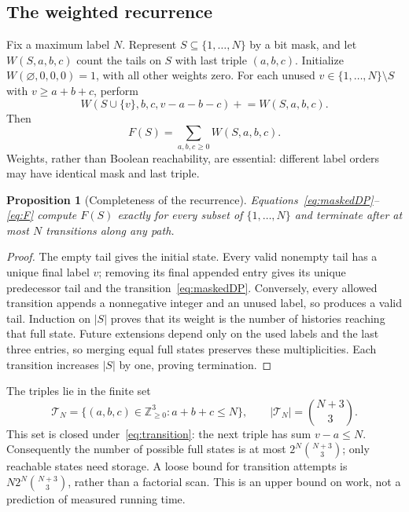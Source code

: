 \documentclass[11pt]{article}
\newtheorem{proposition}[theorem]{Proposition}
\theoremstyle{definition}
\theoremstyle{remark}
\newcommand{\Znn}{\mathbb Z_{\geq0}}
\begin{document}
\subsection{The weighted recurrence}

Fix a maximum label $N$. Represent $S\subseteq\{1,\ldots,N\}$ by a bit
mask, and let $W(S,a,b,c)$ count the tails on $S$ with last triple $(a,b,c)$.
Initialize $W(\varnothing,0,0,0)=1$, with all other weights zero. For each
unused $v\in\{1,\ldots,N\}\setminus S$ with $v\geq a+b+c$, perform
\begin{equation}
 W(S\cup\{v\},b,c,v-a-b-c)\mathrel{+}=W(S,a,b,c).
 \label{eq:maskedDP}
\end{equation}
Then
\begin{equation}
 F(S)=\sum_{a,b,c\geq0}W(S,a,b,c).
 \label{eq:F}
\end{equation}
Weights, rather than Boolean reachability, are essential: different label
orders may have identical mask and last triple.

\begin{proposition}[Completeness of the recurrence]
\label{prop:DP}
Equations~\eqref{eq:maskedDP}--\eqref{eq:F} compute $F(S)$ exactly for every
subset of $\{1,\ldots,N\}$ and terminate after at most $N$ transitions
along any path.
\end{proposition}
\begin{proof}
The empty tail gives the initial state. Every valid nonempty tail has a
unique final label $v$; removing its final appended entry gives its unique
predecessor tail and the transition~\eqref{eq:maskedDP}. Conversely, every
allowed transition appends a nonnegative integer and an unused label, so
produces a valid tail. Induction on $|S|$ proves that its weight is the
number of histories reaching that full state. Future extensions depend
only on the used labels and the last three entries, so merging equal full
states preserves these multiplicities. Each transition increases $|S|$ by
one, proving termination.
\end{proof}

The triples lie in the finite set
\begin{equation}
 \mathcal T_N=\{(a,b,c)\in\Znn^3:a+b+c\leq N\},
 \qquad |\mathcal T_N|=\binom{N+3}{3}.
 \label{eq:triples}
\end{equation}
This set is closed under~\eqref{eq:transition}: the next triple has sum
$v-a\leq N$. Consequently the number of possible full states is at most
$2^N\binom{N+3}{3}$; only reachable states need storage. A loose bound for
transition attempts is $N2^N\binom{N+3}{3}$, rather than a factorial scan.
This is an upper bound on work, not a prediction of measured running time.
\end{document}
